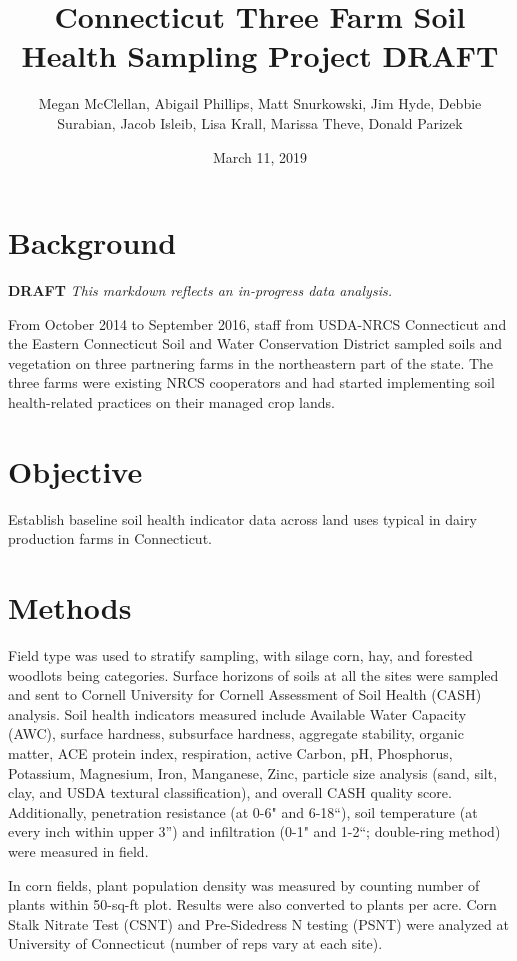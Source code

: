 \documentclass[]{article}
\title{Connecticut Three Farm Soil Health Sampling Project DRAFT}
\author{Megan McClellan, Abigail Phillips, Matt Snurkowski, Jim Hyde, Debbie
Surabian, Jacob Isleib, Lisa Krall, Marissa Theve, Donald Parizek}
\date{March 11, 2019}
\begin{document}
\maketitle

{
\setcounter{tocdepth}{2}
\tableofcontents
}
\section{Background}\label{background}

\textbf{DRAFT} \emph{This markdown reflects an in-progress data
analysis.}

From October 2014 to September 2016, staff from USDA-NRCS Connecticut
and the Eastern Connecticut Soil and Water Conservation District sampled
soils and vegetation on three partnering farms in the northeastern part
of the state. The three farms were existing NRCS cooperators and had
started implementing soil health-related practices on their managed crop
lands.

\section{Objective}\label{objective}

Establish baseline soil health indicator data across land uses typical
in dairy production farms in Connecticut.

\section{Methods}\label{methods}

Field type was used to stratify sampling, with silage corn, hay, and
forested woodlots being categories. Surface horizons of soils at all the
sites were sampled and sent to Cornell University for Cornell Assessment
of Soil Health (CASH) analysis. Soil health indicators measured include
Available Water Capacity (AWC), surface hardness, subsurface hardness,
aggregate stability, organic matter, ACE protein index, respiration,
active Carbon, pH, Phosphorus, Potassium, Magnesium, Iron, Manganese,
Zinc, particle size analysis (sand, silt, clay, and USDA textural
classification), and overall CASH quality score. Additionally,
penetration resistance (at 0-6" and 6-18``), soil temperature (at every
inch within upper 3'') and infiltration (0-1" and 1-2``; double-ring
method) were measured in field.

In corn fields, plant population density was measured by counting number
of plants within 50-sq-ft plot. Results were also converted to plants
per acre. Corn Stalk Nitrate Test (CSNT) and Pre-Sidedress N testing
(PSNT) were analyzed at University of Connecticut (number of reps vary
at each site).
\end{document}
